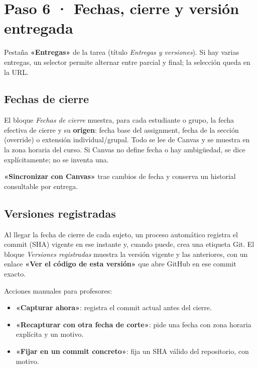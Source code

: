 \documentclass[11pt,a4paper]{article}
\newcommand{\ui}[1]{\textbf{«#1»}}        %
\begin{document}
\section{Paso 6 · Fechas, cierre y versión entregada}

Pestaña \ui{Entregas} de la tarea (título \emph{Entregas y versiones}). Si hay varias entregas, un selector permite alternar entre parcial y final; la selección queda en la URL.

\subsection{Fechas de cierre}

El bloque \emph{Fechas de cierre} muestra, para cada estudiante o grupo, la fecha efectiva de cierre y su \textbf{origen}: fecha base del assignment, fecha de la sección (override) o extensión individual/grupal. Todo se lee de Canvas y se muestra en la zona horaria del curso. Si Canvas no define fecha o hay ambigüedad, se dice explícitamente; no se inventa una.

\ui{Sincronizar con Canvas} trae cambios de fecha y conserva un historial consultable por entrega.

\subsection{Versiones registradas}

Al llegar la fecha de cierre de cada sujeto, un proceso automático registra el commit (SHA) vigente en ese instante y, cuando puede, crea una etiqueta Git. El bloque \emph{Versiones registradas} muestra la versión vigente y las anteriores, con un enlace \ui{Ver el código de esta versión} que abre GitHub en ese commit exacto.

Acciones manuales para profesores:

\begin{itemize}
  \item \ui{Capturar ahora}: registra el commit actual antes del cierre.
  \item \ui{Recapturar con otra fecha de corte}: pide una fecha con zona horaria explícita y un motivo.
  \item \ui{Fijar en un commit concreto}: fija un SHA válido del repositorio, con motivo.
\end{itemize}
\end{document}
